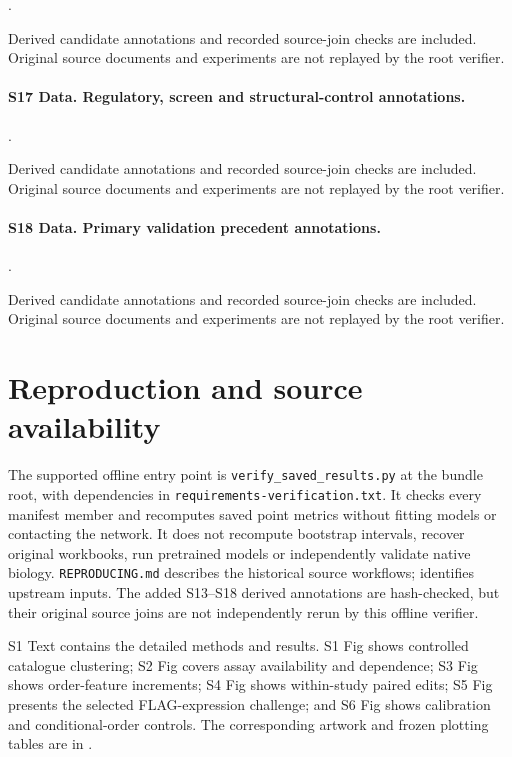 \documentclass[11pt,a4paper]{article}
\begin{document}
{\raggedright {}.\par}

Derived candidate annotations and recorded source-join checks are included. Original source documents and experiments are not replayed by the root verifier.

\paragraph{S17 Data. Regulatory, screen and structural-control annotations.}

{\raggedright {}.\par}

Derived candidate annotations and recorded source-join checks are included. Original source documents and experiments are not replayed by the root verifier.

\paragraph{S18 Data. Primary validation precedent annotations.}

{\raggedright {}.\par}

Derived candidate annotations and recorded source-join checks are included. Original source documents and experiments are not replayed by the root verifier.

\section{Reproduction and source availability}
The supported offline entry point is \texttt{verify\_saved\_results.py} at
the bundle root, with dependencies in
\texttt{requirements-verification.txt}. It checks every manifest member
and recomputes saved point metrics without fitting models or contacting
the network. It does not recompute bootstrap intervals, recover original
workbooks, run pretrained models or independently validate native biology.
\texttt{REPRODUCING.md} describes the historical source workflows;
 identifies upstream inputs.
The added S13--S18 derived annotations are hash-checked, but their original
source joins are not independently rerun by this offline verifier.

S1 Text contains the detailed methods and results. S1 Fig shows controlled
catalogue clustering; S2 Fig covers assay availability and dependence;
S3 Fig shows order-feature increments; S4 Fig shows within-study paired
edits; S5 Fig presents the selected FLAG-expression challenge; and S6 Fig
shows calibration and conditional-order controls. The corresponding
artwork and frozen plotting tables are in .
\clearpage
\end{document}
